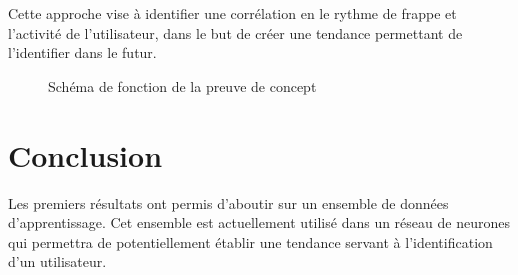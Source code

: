 \documentclass[conference,compsoc]{IEEEtran}
\begin{document}
 Cette approche vise à identifier une corrélation en le rythme de frappe et l'activité de l'utilisateur, dans le but de créer une tendance permettant de l'identifier dans le futur.

 \begin{figure}[!htb]
   \centering
   \caption{Schéma de fonction de la preuve de concept}
   \label{}
 \end{figure}

\section{Conclusion}
Les premiers résultats ont permis d'aboutir sur un ensemble de données d'apprentissage. Cet ensemble est actuellement utilisé dans un réseau de neurones qui permettra de potentiellement établir une tendance servant à l'identification d'un utilisateur.







\end{document}
